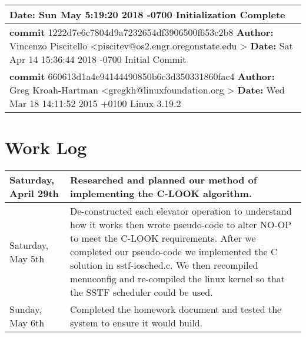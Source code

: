 \documentclass[10pt,draftclsnofoot,onecolumn]{IEEEtran}
\begin{document}
\begin{center}
\begin{tabular}{ | p{14cm} | }
        {\bf Date:}   Sun May 5:19:20 2018 -0700\newline
        \newline Initialization Complete  \\ \hline
        {\bf commit} 1222d7e6c7804d9a7232654df3906500f653c2b8\newline
        {\bf Author:} Vincenzo Piscitello \textless piscitev@os2.engr.oregonstate.edu \textgreater \newline
        {\bf Date:}   Sat Apr 14 15:36:44 2018 -0700\newline
        \newline Initial Commit \\ \hline
        {\bf commit} 660613d1a4e94144490850b6c3d350331860fac4\newline
        {\bf Author:} Greg Kroah-Hartman \textless gregkh@linuxfoundation.org \textgreater \newline
        {\bf Date:}   Wed Mar 18 14:11:52 2015 +0100\newline
        \newline Linux 3.19.2  \\
        \hline
        \end{tabular}
    \end{center}

    \section{Work Log}
    	\begin{center}
        \begin{tabular}{ | p{4cm} | p{10cm} | }
        \hline
        Saturday, April 29th & Researched and planned our method of implementing the C-LOOK algorithm.\\ \hline
        Saturday, May 5th & De-constructed each elevator operation to understand how it works then wrote pseudo-code to alter NO-OP to meet the C-LOOK requirements. After we completed our pseudo-code we implemented the C solution in sstf-iosched.c. We then recompiled menuconfig and re-compiled the linux kernel so that the SSTF scheduler could be used. \\ \hline
        Sunday, May 6th & Completed the homework document and tested the system to ensure it would build.\\ \hline
        \end{tabular}
    \end{center}
\end{document}
